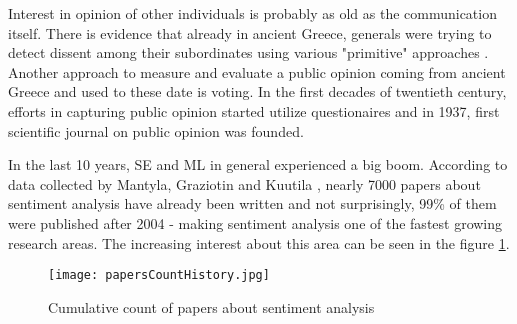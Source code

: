 Interest in opinion of other individuals is probably as old as the communication itself. There is evidence that already in ancient Greece, generals were trying to detect dissent among their subordinates using various "primitive" approaches \cite{richmond1998spies}. Another approach to measure and evaluate a public opinion coming from ancient Greece and used to these date is voting. In the first decades of twentieth century, efforts in capturing public opinion started utilize questionaires and in 1937, first scientific journal on public opinion was founded. 

In the last 10 years, SE and ML in general experienced a big boom. According to data collected by Mantyla, Graziotin and Kuutila \cite{mantyla2018evolution}, nearly 7000 papers about sentiment analysis have already been written and not surprisingly, 99\% of them were published after 2004 - making sentiment analysis one of the fastest growing research areas. The increasing interest about this area can be seen in the figure \ref{fig:papersCountHistory}.

\begin{figure}[H]%
    \centering
	\texttt{[image: papersCountHistory.jpg]}
    \caption{Cumulative count of papers about sentiment analysis \cite{mantyla2018evolution}}%
    \label{fig:papersCountHistory}%
\end{figure}

